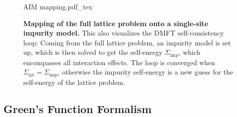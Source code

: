 \documentclass[../notes.tex]{subfiles}
\begin{document}
\begin{figure}[t]
	\centering
	{AIM mapping.pdf_tex}
	\caption{\textbf{Mapping of the full lattice problem onto a single-site impurity model.} This also visualizes the DMFT self-consistency loop: Coming from the full lattice problem, an impurity model is set up, which is then solved to get the self-energy \(\Sigma_{\mathrm{imp}}\), which encompasses all interaction effects. The loop is converged when \(\Sigma_{\mathrm{lat}} = \Sigma_{\mathrm{imp}}\), otherwise the impurity self-energy is a new guess for the self-energy of the lattice problem.}
	\label{fig:DMFT AIM mapping}
\end{figure}

\subsection*{Green's Function Formalism}
\end{document}
